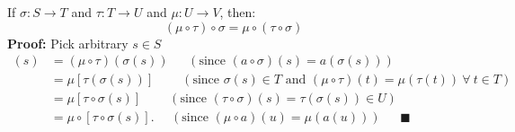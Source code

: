 \begin{lemma}\label{lem:assoc-comp}
If $\sigma:S\rightarrow T$ and $\tau: T \rightarrow U$ and $\mu: U \rightarrow V$, then:
\begin{equation}
    (\mu\circ\tau)\circ \sigma = \mu \circ (\tau \circ \sigma)\nonumber
\end{equation}
\textbf{Proof:} Pick arbitrary $s\in S$\\
\begin{align}
    [(\mu\circ \tau)\circ \sigma](s)&= (\mu\circ\tau)(\sigma(s))\nonumber \ \ \ \ \ \ \ (\text{since }(a\circ\sigma) (s) = a(\sigma(s)))\\
    &= \mu[\tau(\sigma(s))]\nonumber \ \ \ \ \ \ \ \ \ \ (\text{since } \sigma(s)\in T \text{ and } (\mu \circ \tau)(t)= \mu(\tau(t)) \ \forall \ t \in T)\\
    &= \mu[\tau\circ\sigma(s)]\nonumber \ \ \ \ \ \ \ \ \ \ (\text{since }  (\tau \circ \sigma)(s)= \tau(\sigma(s))  \in U ) \\
    &= \mu\circ[\tau\circ\sigma(s)].\nonumber \  \ \ \ \ \ (\text{since }  (\mu\circ a)(u)= \mu(a(u))  )\ \ \ \ \ \ \ \blacksquare
\end{align}
\end{lemma}
